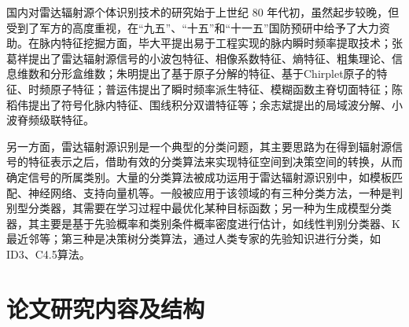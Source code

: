 国内对雷达辐射源个体识别技术的研究始于上世纪 80 年代初，虽然起步较晚，但受到了军方的高度重视，在“九五”、“十五”和“十一五”国防预研中给予了大力资助。在脉内特征挖掘方面，毕大平提出易于工程实现的脉内瞬时频率提取技术；张葛祥提出了雷达辐射源信号的小波包特征、相像系数特征、熵特征、粗集理论、信息维数和分形盒维数；朱明提出了基于原子分解的特征、基于Chirplet原子的特征、时频原子特征；普运伟提出了瞬时频率派生特征、模糊函数主脊切面特征；陈稻伟提出了符号化脉内特征、围线积分双谱特征等；余志斌提出的局域波分解、小波脊频级联特征。

另一方面，雷达辐射源识别是一个典型的分类问题，其主要思路为在得到辐射源信号的特征表示之后，借助有效的分类算法来实现特征空间到决策空间的转换，从而确定信号的所属类别。大量的分类算法被成功运用于雷达辐射源识别中，如模板匹配、神经网络、支持向量机等。一般被应用于该领域的有三种分类方法，一种是判别型分类器，其需要在学习过程中最优化某种目标函数；另一种为生成模型分类器，其主要是基于先验概率和类别条件概率密度进行估计，如线性判别分类器、K最近邻等；第三种是决策树分类算法，通过人类专家的先验知识进行分类，如ID3、C4.5算法。

\section{论文研究内容及结构}